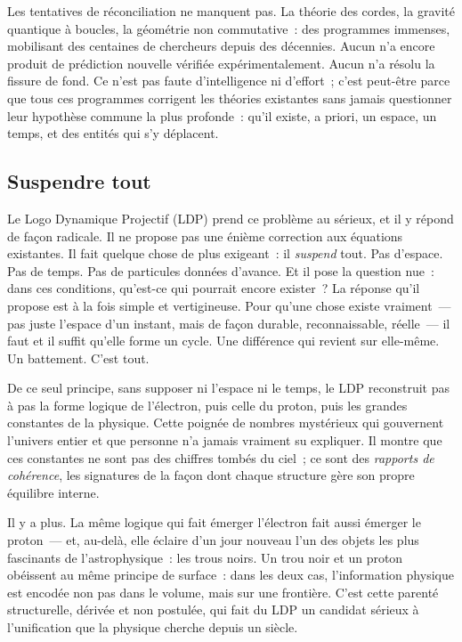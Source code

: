 \documentclass[12pt, a4paper, openright]{book}
\begin{document}
\medskip

Les tentatives de réconciliation ne manquent pas. La théorie des cordes, la gravité quantique à boucles, la géométrie non commutative~: des programmes immenses, mobilisant des centaines de chercheurs depuis des décennies. Aucun n'a encore produit de prédiction nouvelle vérifiée expérimentalement. Aucun n'a résolu la fissure de fond. Ce n'est pas faute d'intelligence ni d'effort~; c'est peut-être parce que tous ces programmes corrigent les théories existantes sans jamais questionner leur hypothèse commune la plus profonde~: qu'il existe, a priori, un espace, un temps, et des entités qui s'y déplacent.

\subsection*{Suspendre tout}

Le Logo Dynamique Projectif (LDP) prend ce problème au sérieux, et il y répond de façon radicale. Il ne propose pas une énième correction aux équations existantes. Il fait quelque chose de plus exigeant~: il \emph{suspend} tout. Pas d'espace. Pas de temps. Pas de particules données d'avance. Et il pose la question nue~: dans ces conditions, qu'est-ce qui pourrait encore exister~? La réponse qu'il propose est à la fois simple et vertigineuse. Pour qu'une chose existe vraiment~--- pas juste l'espace d'un instant, mais de façon durable, reconnaissable, réelle~--- il faut et il suffit qu'elle forme un cycle. Une différence qui revient sur elle-même. Un battement. C'est tout.

\medskip

De ce seul principe, sans supposer ni l'espace ni le temps, le LDP reconstruit pas à pas la forme logique de l'électron, puis celle du proton, puis les grandes constantes de la physique. Cette poignée de nombres mystérieux qui gouvernent l'univers entier et que personne n'a jamais vraiment su expliquer. Il montre que ces constantes ne sont pas des chiffres tombés du ciel~; ce sont des \emph{rapports de cohérence}, les signatures de la façon dont chaque structure gère son propre équilibre interne.

\medskip

Il y a plus. La même logique qui fait émerger l'électron fait aussi émerger le proton~--- et, au-delà, elle éclaire d'un jour nouveau l'un des objets les plus fascinants de l'astrophysique~: les trous noirs. Un trou noir et un proton obéissent au même principe de surface~: dans les deux cas, l'information physique est encodée non pas dans le volume, mais sur une frontière. C'est cette parenté structurelle, dérivée et non postulée, qui fait du LDP un candidat sérieux à l'unification que la physique cherche depuis un siècle. 
\end{document}
